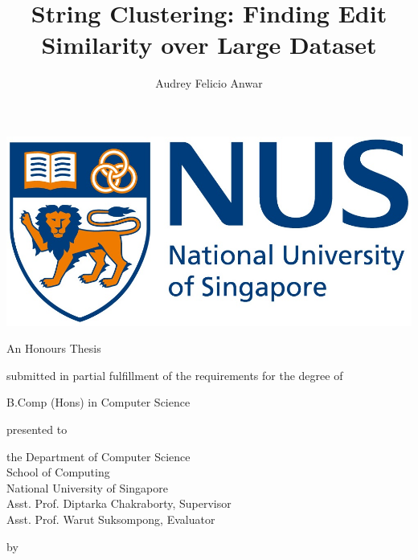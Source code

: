 \documentclass[titlepage, a4paper, 12pt, oneside]{book}
\title{String Clustering: Finding Edit Similarity over Large Dataset} \let\Title\@title
\author{Audrey Felicio Anwar} \let\Author\@author
\numberwithin{equation}{section}
\theoremstyle{definition}
\begin{document}
\pagebreak
\vspace{1cm}
\begin{center}
    \includegraphics[scale=0.7]{images/NUS Logo.jpg}
\end{center}

\begin{center}
    \normalfont\bfseries\LARGE
    \textbf{\Title}
\end{center}

\vspace{1cm}

\begin{center}
    An Honours Thesis 
    
    submitted in partial fulfillment of the requirements for the degree of
    
    B.Comp (Hons) in Computer Science
\end{center}

\vspace{1cm}

\begin{center}
    presented to
    
    \vspace{0.2cm}
    the Department of Computer Science \\

    School of Computing \\

    National University of Singapore \\

    Asst. Prof. Diptarka Chakraborty, Supervisor \\

    Asst. Prof. Warut Suksompong, Evaluator
\end{center}

\vspace{1cm}

\begin{center}
    by
    
    \Author
\end{center}
\end{document}
